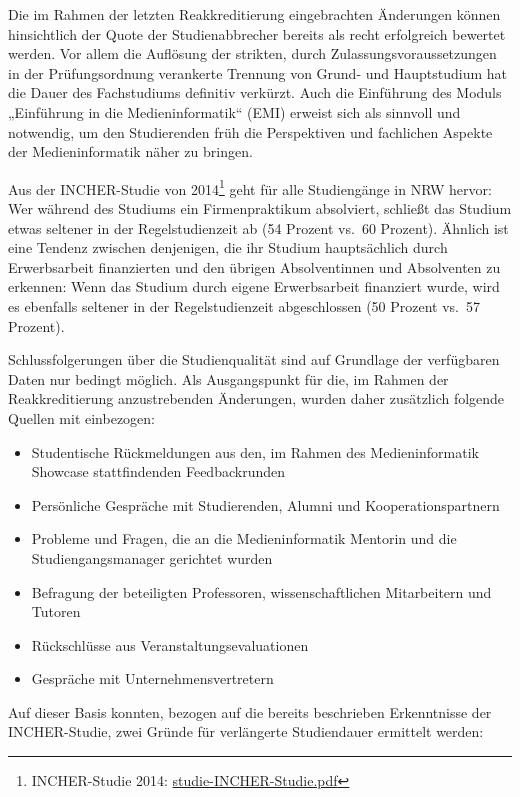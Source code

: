 Die im Rahmen der letzten Reakkreditierung eingebrachten Änderungen
können hinsichtlich der Quote der Studienabbrecher bereits als recht
erfolgreich bewertet werden. Vor allem die Auflösung der strikten, durch
Zulassungsvoraussetzungen in der Prüfungsordnung verankerte Trennung von
Grund- und Hauptstudium hat die Dauer des Fachstudiums definitiv
verkürzt. Auch die Einführung des Moduls „Einführung in die
Medieninformatik`` (EMI) erweist sich als sinnvoll und notwendig, um den
Studierenden früh die Perspektiven und fachlichen Aspekte der
Medieninformatik näher zu bringen.

Aus der INCHER-Studie von 2014\footnote{INCHER-Studie 2014:
  \href{../anhaenge/studie-INCHER-Studie.pdf}{studie-INCHER-Studie.pdf}}
geht für alle Studiengänge in NRW hervor: Wer während des Studiums ein
Firmenpraktikum absolviert, schließt das Studium etwas seltener in der
Regelstudienzeit ab (54 Prozent vs.~60 Prozent). Ähnlich ist eine
Tendenz zwischen denjenigen, die ihr Studium hauptsächlich durch
Erwerbsarbeit finanzierten und den übrigen Absolventinnen und
Absolventen zu erkennen: Wenn das Studium durch eigene Erwerbsarbeit
finanziert wurde, wird es ebenfalls seltener in der Regelstudienzeit
abgeschlossen (50 Prozent vs.~57 Prozent).

Schlussfolgerungen über die Studienqualität sind auf Grundlage der
verfügbaren Daten nur bedingt möglich. Als Ausgangspunkt für die, im
Rahmen der Reakkreditierung anzustrebenden Änderungen, wurden daher
zusätzlich folgende Quellen mit einbezogen:

\begin{itemize}
\tightlist
\item
  Studentische Rückmeldungen aus den, im Rahmen des Medieninformatik
  Showcase stattfindenden Feedbackrunden
\item
  Persönliche Gespräche mit Studierenden, Alumni und
  Kooperationspartnern
\item
  Probleme und Fragen, die an die Medieninformatik Mentorin und die
  Studiengangsmanager gerichtet wurden
\item
  Befragung der beteiligten Professoren, wissenschaftlichen Mitarbeitern
  und Tutoren
\item
  Rückschlüsse aus Veranstaltungsevaluationen
\item
  Gespräche mit Unternehmensvertretern
\end{itemize}

Auf dieser Basis konnten, bezogen auf die bereits beschrieben
Erkenntnisse der INCHER-Studie, zwei Gründe für verlängerte Studiendauer
ermittelt werden:

